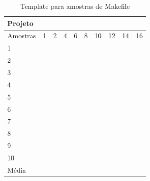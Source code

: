 \begin{table}[h]
\centering
\caption{Template para amostras de Makefile}
\label{tab:makefile}
\begin{tabular}{|l|l|l|l|l|l|l|l|l|l|}
\hline
Projeto & \multicolumn{8}{l|}{} &  \\ \hline
Amostras & 1 & 2 & 4 & 6 & 8 & 10 & 12 & 14 & 16 \\ \hline
1 &  &  &  &  &  &  &  &  &  \\ \hline
2 &  &  &  &  &  &  &  &  &  \\ \hline
3 &  &  &  &  &  &  &  &  &  \\ \hline
4 &  &  &  &  &  &  &  &  &  \\ \hline
5 &  &  &  &  &  &  &  &  &  \\ \hline
6 &  &  &  &  &  &  &  &  &  \\ \hline
7 &  &  &  &  &  &  &  &  &  \\ \hline
8 &  &  &  &  &  &  &  &  &  \\ \hline
9 &  &  &  &  &  &  &  &  &  \\ \hline
10 &  &  &  &  &  &  &  &  &  \\ \hline
Média &  &  &  &  &  &  &  &  &  \\ \hline
\end{tabular}
\end{table}


